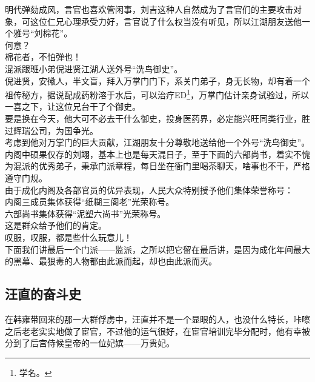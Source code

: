 \begin{multicols}{\theparacolNo}
明代弹劾成风，言官也喜欢管闲事，刘吉这种人自然成为了言官们的主要攻击对象，可这位仁兄心理承受力好，言官说了什么权当没有听见，所以江湖朋友送他一个雅号“刘棉花”。\\

何意？\\

棉花者，不怕弹也！\\

混派跟班小弟倪进贤江湖人送外号“洗鸟御史”。\\

倪进贤，安徽人，半文盲，拜入万掌门门下，系关门弟子，身无长物，却有着一个祖传秘方，据说配成药粉溶于水后，可以治疗ED\footnote{学名。}，万掌门估计亲身试验过，所以一喜之下，让这位兄台干了个御史。\\

要是换在今天，他大可不必去干什么御史，投身医药界，必定能兴旺同类行业，胜过辉瑞公司，为国争光。\\

考虑到他对万掌门的巨大贡献，江湖朋友十分尊敬地送给他一个外号“洗鸟御史”。\\

内阁中硕果仅存的刘翊，基本上也是每天混日子，至于下面的六部尚书，着实不愧为混派的优秀弟子，秉承门派章程，每日坐在衙门里喝茶聊天，啥事也不干，严格遵守门规。\\

由于成化内阁及各部官员的优异表现，人民大众特别授予他们集体荣誉称号：\\

内阁三成员集体获得“纸糊三阁老”光荣称号。\\

六部尚书集体获得“泥塑六尚书”光荣称号。\\

这是群众给予他们的肯定。\\

叹服，叹服，都是些什么玩意儿！\\

下面我们讲最后一个门派——监派，之所以把它留在最后讲，是因为成化年间最大的黑幕、最狠毒的人物都由此派而起，却也由此派而灭。\\

\subsection{汪直的奋斗史}
在韩雍带回来的那一大群俘虏中，汪直并不是一个显眼的人，也没什么特长，咔嚓之后老老实实地做了宦官，不过他的运气很好，在宦官培训完毕分配时，他有幸被分到了后宫侍候皇帝的一位妃嫔——万贵妃。\\


\end{multicols}

